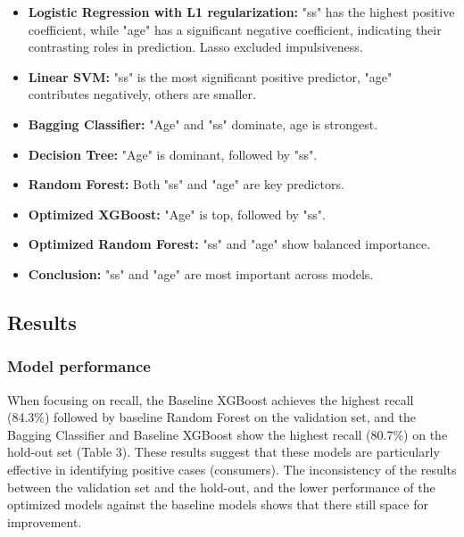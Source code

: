 \documentclass{article}
\begin{document}
\begin{itemize}
    \item \textbf{Logistic Regression with L1 regularization:} "ss" has the highest positive coefficient, while "age" has a significant negative coefficient, indicating their contrasting roles in prediction. Lasso excluded impulsiveness.
    
    \item \textbf{Linear SVM:} "ss" is the most significant positive predictor, "age" contributes negatively, others are smaller.
    
    \item \textbf{Bagging Classifier:} "Age" and "ss" dominate, age is strongest.
    
    \item \textbf{Decision Tree:} "Age" is dominant, followed by "ss".
    
    \item \textbf{Random Forest:} Both "ss" and "age" are key predictors.
    
    \item \textbf{Optimized XGBoost:} "Age" is top, followed by "ss".
    
    \item \textbf{Optimized Random Forest:} "ss" and "age" show balanced importance.
    
    \item \textbf{Conclusion:} "ss" and "age" are most important across models.
\end{itemize}

\subsection*{Results}

\subsubsection*{Model performance}

When focusing on recall, the Baseline XGBoost achieves the highest recall (84.3\%) followed by baseline Random Forest on the validation set, and the Bagging Classifier and Baseline XGBoost show the highest recall (80.7\%) on the hold-out set (Table 3). These results suggest that these models are particularly effective in identifying positive cases (consumers). The inconsistency of the results between the validation set and the hold-out, and the lower performance of the optimized models against the baseline models shows that there still space for improvement.
\end{document}
